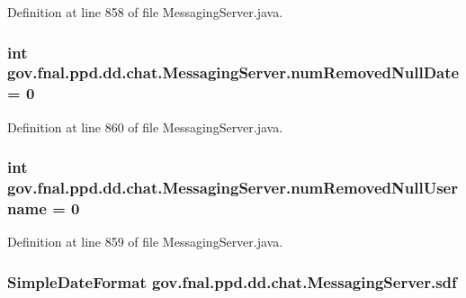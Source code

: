 Definition at line 858 of file Messaging\-Server.\-java.

\hypertarget{classgov_1_1fnal_1_1ppd_1_1dd_1_1chat_1_1MessagingServer_ab986fa29bcdc51bd186ad23e1c699426}{
\subsubsection[{num\-Removed\-Null\-Date}]{\setlength{\rightskip}{0pt plus 5cm}int gov.\-fnal.\-ppd.\-dd.\-chat.\-Messaging\-Server.\-num\-Removed\-Null\-Date = 0}}\label{classgov_1_1fnal_1_1ppd_1_1dd_1_1chat_1_1MessagingServer_ab986fa29bcdc51bd186ad23e1c699426}


Definition at line 860 of file Messaging\-Server.\-java.

\hypertarget{classgov_1_1fnal_1_1ppd_1_1dd_1_1chat_1_1MessagingServer_a84d7bc143f1eee20c7e39ce9024783c9}{
\subsubsection[{num\-Removed\-Null\-Username}]{\setlength{\rightskip}{0pt plus 5cm}int gov.\-fnal.\-ppd.\-dd.\-chat.\-Messaging\-Server.\-num\-Removed\-Null\-Username = 0}}\label{classgov_1_1fnal_1_1ppd_1_1dd_1_1chat_1_1MessagingServer_a84d7bc143f1eee20c7e39ce9024783c9}


Definition at line 859 of file Messaging\-Server.\-java.

\hypertarget{classgov_1_1fnal_1_1ppd_1_1dd_1_1chat_1_1MessagingServer_ac727c375b30722fb0d0a88f27eb97954}{
\subsubsection[{sdf}]{\setlength{\rightskip}{0pt plus 5cm}Simple\-Date\-Format gov.\-fnal.\-ppd.\-dd.\-chat.\-Messaging\-Server.\-sdf\hspace{0.3cm}{\ttfamily [protected]}}}\label{classgov_1_1fnal_1_1ppd_1_1dd_1_1chat_1_1MessagingServer_ac727c375b30722fb0d0a88f27eb97954}


